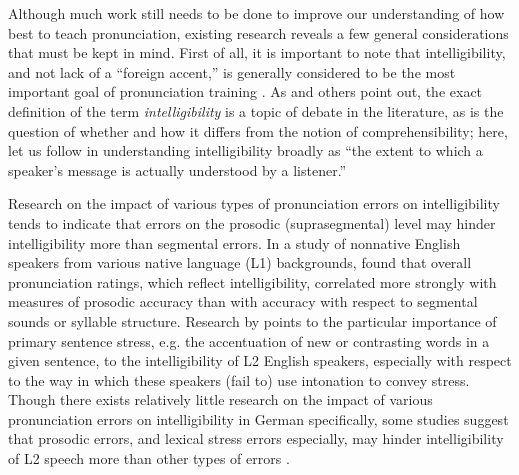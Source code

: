 
Although much work still needs to be done to improve our understanding of how best to teach pronunciation, existing research reveals a few general considerations that must be kept in mind.
	First of all, it is important to note that 
intelligibility, and not lack of a ``foreign accent,'' is generally considered to be the most important goal of pronunciation training \citep{Munro1999,Neri2002,Derwing2005,Field2005,Witt2012}. %
As \textcite{Field2005} and others point out, the exact definition of the term \textit{intelligibility} is a topic of debate in the literature, as is the question of whether and how it differs from the notion of comprehensibility; 
here, let us follow \textcite[p.~289]{Munro1999} in understanding intelligibility broadly as ``the extent to which a speaker’s message is actually understood by a listener.'' 
	

Research on the impact of various types of pronunciation errors on intelligibility tends to indicate that errors on the prosodic (suprasegmental) level may hinder intelligibility more than segmental errors.
%
% 
In a study of nonnative English speakers from various native language (L1) backgrounds, \textcite{Anderson-Hsieh1992} found that overall pronunciation ratings, which reflect intelligibility, correlated more strongly with measures of prosodic accuracy than with accuracy with respect to segmental sounds or syllable structure.
%
Research by \textcite{Hahn2004} points to the particular importance of primary sentence stress, e.g. the accentuation of new or contrasting words in a given sentence, to the intelligibility of L2 English speakers, especially with respect to the way in which these speakers (fail to) use intonation to convey stress.
%
%
Though there exists relatively little research on the impact of various pronunciation errors on intelligibility in German specifically, some studies suggest that prosodic errors, and lexical stress errors especially, may hinder intelligibility of L2 speech more than other types of errors \citep{Hirschfeld1994,Hirschfeld2007}.



